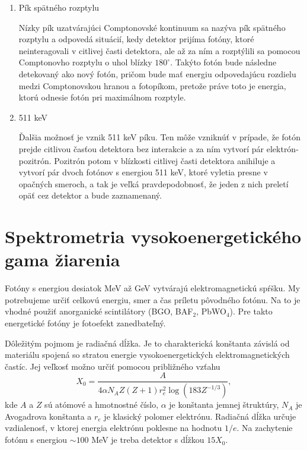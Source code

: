 \documentclass[../../main.tex]{subfiles}
\begin{document}
\begin{enumerate}
\item Pík spätného rozptylu

Nízky pík uzatvárajúci Comptonovské kontinuum sa nazýva pík spätného rozptylu a odpovedá situácií, kedy detektor prijíma fotóny, ktoré neinteragovali v citlivej časti detektora, ale až za ním a rozptýlili sa pomocou Comptonovho rozptylu o uhol blízky $180^\circ$. Takýto fotón bude následne detekovaný ako nový fotón, pričom bude mať energiu odpovedajúcu rozdielu medzi Comptonovskou hranou a fotopíkom, pretože práve toto je energia, ktorú odnesie fotón pri maximálnom rozptyle.

\item 511 keV

Ďalšia možnosť je vznik 511 keV píku. Ten môže vzniknúť v prípade, že fotón prejde citlivou časťou detektora bez interakcie a za ním vytvorí pár elektrón-pozitrón. Pozitrón potom v blízkosti citlivej časti detektora anihiluje a vytvorí pár dvoch fotónov s energiou 511 keV, ktoré vyletia presne v opačných smeroch, a tak je veľká pravdepodobnosť, že jeden z nich preletí opäť cez detektor a bude zaznamenaný. 

\end{enumerate}

\section{Spektrometria vysokoenergetického gama žiarenia}

Fotóny s energiou desiatok MeV až GeV vytvárajú elektromagnetickú spŕšku. My potrebujeme určiť celkovú energiu, smer a čas príletu pôvodného fotónu. Na to je vhodné použiť anorganické scintilátory (BGO, BAF$_2$, PbWO$_4$). Pre takto energetické fotóny je fotoefekt zanedbateľný.

Dôležitým pojmom je radiačná dĺžka. Je to charakterická konštanta závislá od materiálu spojená so stratou energie vysokoenergetických elektromagnetických častíc. Jej veľkosť možno určiť pomocou približného vzťahu
\begin{equation}
X_0=\dfrac{A}{4\alpha N_A Z(Z+1)r_e^2 \log(183Z^{-1/3})},
\end{equation}
kde $A$ a $Z$ sú atómové a hmotnostné číslo, $\alpha$ je konštanta jemnej štruktúry, $N_A$ je Avogadrova konštanta a $r_e$ je klasický polomer elektrónu. Radiačná dĺžka určuje vzdialenosť, v ktorej energia elektrónu poklesne na hodnotu $1/e$. Na zachytenie fotónu s energiou $\sim 100$ MeV je treba detektor s dĺžkou $15X_0$.
\end{document}

